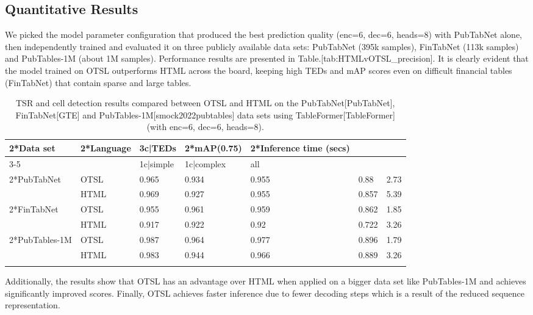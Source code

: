 \documentclass[11pt,a4paper]{article}
\begin{document}
\subsection{Quantitative Results}

We picked the model parameter configuration that produced the best prediction quality (enc=6, dec=6, heads=8) with PubTabNet alone, then independently trained and evaluated it on three publicly available data sets: PubTabNet (395k samples), FinTabNet (113k samples) and PubTables-1M (about 1M samples). Performance results are presented in Table.[tab:HTMLvOTSL\_precision]. It is clearly evident that the model trained on OTSL outperforms HTML across the board, keeping high TEDs and mAP scores even on difficult financial tables (FinTabNet) that contain sparse and large tables.

\begin{table}[h]
\caption{TSR and cell detection results compared between OTSL and HTML on the PubTabNet[PubTabNet], FinTabNet[GTE] and PubTables-1M[smock2022pubtables] data sets using TableFormer[TableFormer] (with enc=6, dec=6, heads=8).}
\begin{tabular}{|l|l|l|l|l|l|l|}
\hline
2*Data set & 2*Language & 3c|TEDs & 2*mAP(0.75) & 2*Inference time (secs) &  &  \\ \hline
3-5 &  & 1c|simple & 1c|complex & all &  &  \\ \hline
2*PubTabNet & OTSL & 0.965 & 0.934 & 0.955 & 0.88 & 2.73 \\ \hline
 & HTML & 0.969 & 0.927 & 0.955 & 0.857 & 5.39 \\ \hline
2*FinTabNet & OTSL & 0.955 & 0.961 & 0.959 & 0.862 & 1.85 \\ \hline
 & HTML & 0.917 & 0.922 & 0.92 & 0.722 & 3.26 \\ \hline
2*PubTables-1M & OTSL & 0.987 & 0.964 & 0.977 & 0.896 & 1.79 \\ \hline
 & HTML & 0.983 & 0.944 & 0.966 & 0.889 & 3.26 \\ \hline
 &  &  &  &  &  &  \\ \hline
\end{tabular}
\end{table}

Additionally, the results show that OTSL has an advantage over HTML when applied on a bigger data set like PubTables-1M and achieves significantly improved scores. Finally, OTSL achieves faster inference due to fewer decoding steps which is a result of the reduced sequence representation.
\end{document}
